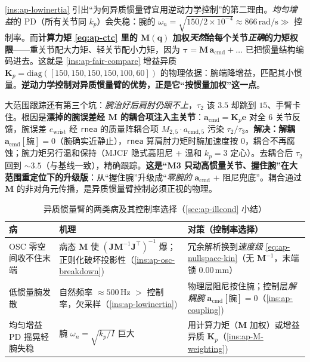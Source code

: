 \begin{insight}\label{ins:ap-M-weighting}
\cref{ins:ap-lowinertia} 引出“为何异质惯量臂宜用逆动力学控制”的第二理由。\emph{均匀增益}的 PD（所有关节同 $k_p$）会失稳：腕的 $\omega_n=\sqrt{150/2\times10^{-4}}\approx 866\,\mathrm{rad/s}\gg$ 控制率。而\textbf{计算力矩 \cref{eq:ap-ctc} 里的 $\mathbf{M}(\mathbf{q})$ 加权\emph{天然}给每个关节\emph{正确}的力矩权限}——重关节配大力矩、轻关节配小力矩，因为 $\boldsymbol{\tau}=\mathbf{M}\,\mathbf{a}_{\mathrm{cmd}}+\dots$ 已把惯量结构编码进去。这就是 \cref{ins:ap-fair-compare} 增益异质 $\mathbf{K}_p=\mathrm{diag}([150,150,150,150,100,60])$ 的物理依据：腕端降增益，匹配其小惯量。\textbf{逆动力学控制对异质惯量臂的优势，正是它“按惯量加权”这一点}。
\end{insight}

\begin{insight}\label{ins:ap-coupling}
大范围跟踪还有第三个坑：\emph{腕治好后肩肘仍跟不上}，$\tau_2$ 该 $3.5$ 却跳到 $15$、手臂卡住。根因是\textbf{漂掉的腕误差经 $\mathbf{M}$ 的耦合项注入主关节}：$\mathbf{a}_{\mathrm{cmd}}=\mathbf{K}_p\mathbf{e}$ 对全 $6$ 关节反馈，腕误差 $e_{\mathrm{wrist}}$ 经 \texttt{rnea} 的质量阵耦合项 $M_{2,5}\cdot a_{\mathrm{cmd},5}$ 污染 $\tau_2/\tau_3$。\textbf{解决：解耦} $\mathbf{a}_{\mathrm{cmd}}[\text{腕}]=0$（腕确实近静止），\texttt{rnea} 算肩肘力矩时腕加速度按 $0$，耦合不再腐蚀；腕力矩另行温和保持（MJCF 隐式高阻尼 + 温和 $k_p=3$ 定心）。去耦合后 $\tau_2$ 回到 $\sim3.5$（与基线一致），精确跟踪。\textbf{这是“M3 只动高惯量关节、握住腕”在大范围重定位下的升级版}：从“握住腕”升级成“\emph{零腕的} $\mathbf{a}_{\mathrm{cmd}}$ + 阻尼兜底”。耦合通过 $\mathbf{M}$ 的非对角元传播，是异质惯量臂控制必须正视的物理。
\end{insight}

\begin{table}[H]\centering\small
\caption{异质惯量臂的两类病及其控制率选择（\cref{sec:ap-illcond} 小结）}
\begin{tabular}{p{} p{} p{}}
\toprule
病 & 机理 & 对策（控制率选择）\\
\midrule
OSC 零空间收不住末端 & 病态 $\mathbf{M}$ 使 $(\mathbf{J}\mathbf{M}^{-1}\mathbf{J}^\top)^{-1}$ 爆；正则化破坏投影性（\cref{ins:ap-osc-breakdown})& 冗余解析换到\emph{速度级} \cref{eq:ap-nullspace-kin}（无 $\mathbf{M}^{-1}$，末端锁 $0.00\,\mathrm{mm}$）\\
低惯量腕发散 & 自然频率 $\approx500\,\mathrm{Hz}$ $>$ 控制率，欠采样（\cref{ins:ap-lowinertia})& 物理层阻尼按住腕；控制层\emph{解耦腕} $\mathbf{a}_{\mathrm{cmd}}[\text{腕}]=0$（\cref{ins:ap-coupling})\\
均匀增益 PD 摇晃轻腕失稳 & 腕 $\omega_n=\sqrt{k_p/I}$ 巨大 & 用计算力矩（$\mathbf{M}$ 加权）或增益异质 $\mathbf{K}_p$（\cref{ins:ap-M-weighting})\\
\bottomrule
\end{tabular}
\label{tab:ap-illcond}
\end{table}

